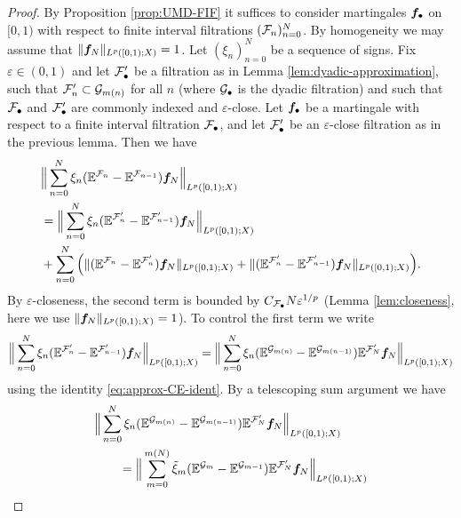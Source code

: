 \begin{proof}
  By Proposition \ref{prop:UMD-FIF} it suffices to consider martingales $\bm{f}_{\bullet}$ on $[0,1)$ with respect to finite interval filtrations $(\mathcal{F}_{n})_{n=0}^{N}$.
  By homogeneity we may assume that $\|\bm{f}_{N}\|_{L^p([0,1);X)} = 1$.
  Let $(\xi_{n})_{n=0}^{N}$ be a sequence of signs.
  Fix $\varepsilon \in (0,1)$ and let $\mathcal{F}'_{\bullet}$ be a filtration as in Lemma \ref{lem:dyadic-approximation}, such that $\mathcal{F}_{n}' \subset \mathcal{G}_{m(n)}$ for all $n$ (where $\mathcal{G}_{\bullet}$ is the dyadic filtration) and such that $\mathcal{F}_{\bullet}$ and $\mathcal{F}_{\bullet}'$ are commonly indexed and $\varepsilon$-close.
  Let $\bm{f}_{\bullet}$ be a martingale with respect to a finite interval filtration $\mathcal{F}_{\bullet}$, and let $\mathcal{F}'_{\bullet}$ be an $\varepsilon$-close filtration as in the previous lemma.
  Then we have
  \begin{equation*}
    \begin{aligned}
      &\Big\| \sum_{n=0}^{N} \xi_{n} (\mathbb{E}^{\mathcal{F}_{n}} - \mathbb{E}^{\mathcal{F}_{n-1}}) \bm{f}_{N} \Big\|_{L^p([0,1);X)} \\
      &= \Big\| \sum_{n=0}^{N} \xi_{n} (\mathbb{E}^{\mathcal{F}'_{n}} - \mathbb{E}^{\mathcal{F}'_{n-1}}) \bm{f}_{N} \Big\|_{L^p([0,1);X)} \\
      &+ \sum_{n=0}^{N} \Big( \| (\mathbb{E}^{\mathcal{F}_{n}} - \mathbb{E}^{\mathcal{F}'_{n}}) \bm{f}_{N}\|_{L^p([0,1);X)}
      +  \| (\mathbb{E}^{\mathcal{F}'_{n}} - \mathbb{E}^{\mathcal{F}'_{n-1}}) \bm{f}_{N} \|_{L^p([0,1);X)} \Big).
    \end{aligned}
  \end{equation*}
  By $\varepsilon$-closeness, the second term is bounded by $C_{\mathcal{F}_{\bullet}} N \varepsilon^{1/p}$ (Lemma \ref{lem:closeness}, here we use $\|\bm{f}_{N}\|_{L^p([0,1);X)} = 1$).
  To control the first term we write
  \begin{equation*}
    \Big\| \sum_{n=0}^{N} \xi_{n} (\mathbb{E}^{\mathcal{F}'_{n}} - \mathbb{E}^{\mathcal{F}'_{n-1}}) \bm{f}_{N} \Big\|_{L^p([0,1);X)}
    = \Big\| \sum_{n=0}^{N} \xi_{n} (\mathbb{E}^{\mathcal{G}_{m(n)}} - \mathbb{E}^{\mathcal{G}_{m(n-1)}}) \mathbb{E}^{\mathcal{F}'_{N}} \bm{f}_{N} \Big\|_{L^p([0,1);X)}
  \end{equation*}
  using the identity \eqref{eq:approx-CE-ident}.
  By a telescoping sum argument we have
  \begin{equation*}
    \begin{aligned}
      &\Big\| \sum_{n=0}^{N} \xi_{n} (\E^{\mc{G}_{m(n)}} - \E^{\mc{G}_{m(n-1)}}) \E^{\mc{F}'_{N}} \mb{f}_{N} \Big\|_{L^p([0,1);X)} \\
      &\qquad = \Big\| \sum_{m=0}^{m(N)} \tilde{\xi}_{m} (\E^{\mc{G}_{m}} - \E^{\mc{G}_{m-1}}) \E^{\mc{F}'_{N}} \mb{f}_{N} \Big\|_{L^p([0,1);X)}

\end{aligned}
\end{equation*}
\end{proof}
